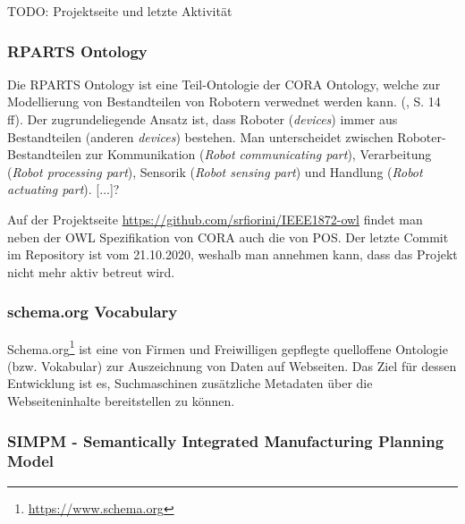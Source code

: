 \documentclass{article}
\begin{document}
TODO: Projektseite und letzte Aktivität

\subsubsection{RPARTS Ontology}


Die RPARTS Ontology ist eine Teil-Ontologie der CORA Ontology, welche zur Modellierung von Bestandteilen von Robotern verwednet werden kann. (\cite{fiorini2015extensions}, S. 14 ff).
Der zugrundeliegende Ansatz ist, dass Roboter (\textit{devices}) immer aus Bestandteilen (anderen \textit{devices}) bestehen.
Man unterscheidet zwischen Roboter-Bestandteilen zur Kommunikation (\textit{Robot communicating part}), Verarbeitung (\textit{Robot processing part}), Sensorik (\textit{Robot sensing part}) und Handlung (\textit{Robot actuating part}).
[...]?

Auf der Projektseite \url{https://github.com/srfiorini/IEEE1872-owl} findet man neben der OWL Spezifikation von CORA auch die von POS. Der letzte Commit im Repository ist vom 21.10.2020, weshalb man annehmen kann, dass das Projekt nicht mehr aktiv betreut wird.


\subsubsection{schema.org Vocabulary}

Schema.org\footnote{\url{https://www.schema.org}} ist eine von Firmen und Freiwilligen gepflegte quelloffene Ontologie (bzw. Vokabular) zur Auszeichnung von Daten auf Webseiten.
Das Ziel für dessen Entwicklung ist es, Suchmaschinen zusätzliche Metadaten über die Webseiteninhalte bereitstellen zu können.

\subsubsection{SIMPM - Semantically Integrated Manufacturing Planning Model}
\end{document}
